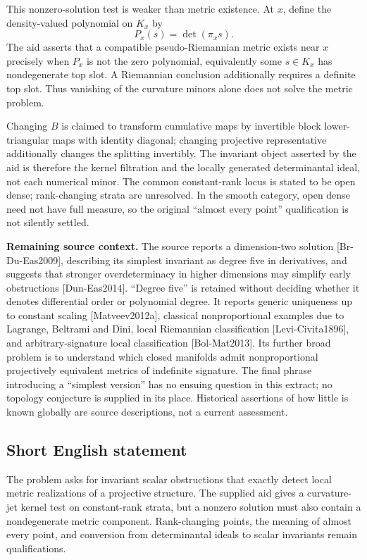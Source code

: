 \documentclass[11pt]{article}
\begin{document}
This nonzero-solution test is weaker than metric existence. At $x$, define the density-valued polynomial on $K_x$ by
\[
 P_x(s)=\det(\pi_xs).
\]
The aid asserts that a compatible pseudo-Riemannian metric exists near $x$ precisely when $P_x$ is not the zero polynomial, equivalently some $s\in K_x$ has nondegenerate top slot. A Riemannian conclusion additionally requires a definite top slot. Thus vanishing of the curvature minors alone does not solve the metric problem.

Changing $B$ is claimed to transform cumulative maps by invertible block lower-triangular maps with identity diagonal; changing projective representative additionally changes the splitting invertibly. The invariant object asserted by the aid is therefore the kernel filtration and the locally generated determinantal ideal, not each numerical minor. The common constant-rank locus is stated to be open dense; rank-changing strata are unresolved. In the smooth category, open dense need not have full measure, so the original ``almost every point'' qualification is not silently settled.

\textbf{Remaining source context.} The source reports a dimension-two solution [Br-Du-Eas2009], describing its simplest invariant as degree five in derivatives, and suggests that stronger overdeterminacy in higher dimensions may simplify early obstructions [Dun-Eas2014]. ``Degree five'' is retained without deciding whether it denotes differential order or polynomial degree. It reports generic uniqueness up to constant scaling [Matveev2012a], classical nonproportional examples due to Lagrange, Beltrami and Dini, local Riemannian classification [Levi-Civita1896], and arbitrary-signature local classification [Bol-Mat2013]. Its further broad problem is to understand which closed manifolds admit nonproportional projectively equivalent metrics of indefinite signature. The final phrase introducing a ``simplest version'' has no ensuing question in this extract; no topology conjecture is supplied in its place. Historical assertions of how little is known globally are source descriptions, not a current assessment.
\subsection{Short English statement}
The problem asks for invariant scalar obstructions that exactly detect local metric realizations of a projective structure. The supplied aid gives a curvature-jet kernel test on constant-rank strata, but a nonzero solution must also contain a nondegenerate metric component. Rank-changing points, the meaning of almost every point, and conversion from determinantal ideals to scalar invariants remain qualifications.
\end{document}
